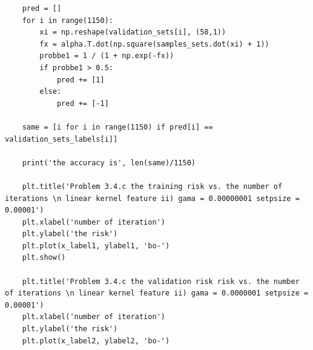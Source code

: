 \documentclass[11pt]{article}
\begin{document}
\begin{lstlisting}
	pred = []
	for i in range(1150):
		xi = np.reshape(validation_sets[i], (58,1))
		fx = alpha.T.dot(np.square(samples_sets.dot(xi) + 1))
		probbe1 = 1 / (1 + np.exp(-fx))
		if probbe1 > 0.5:
			pred += [1]
		else:
			pred += [-1]

	same = [i for i in range(1150) if pred[i] == validation_sets_labels[i]]

	print('the accuracy is', len(same)/1150)

	plt.title('Problem 3.4.c the training risk vs. the number of iterations \n linear kernel feature ii) gama = 0.00000001 setpsize = 0.00001')
	plt.xlabel('number of iteration')
	plt.ylabel('the risk')
	plt.plot(x_label1, ylabel1, 'bo-')
	plt.show()

	plt.title('Problem 3.4.c the validation risk risk vs. the number of iterations \n linear kernel feature ii) gama = 0.0000001 setpsize = 0.00001')
	plt.xlabel('number of iteration')
	plt.ylabel('the risk')
	plt.plot(x_label2, ylabel2, 'bo-')

\end{lstlisting}
\end{document}
